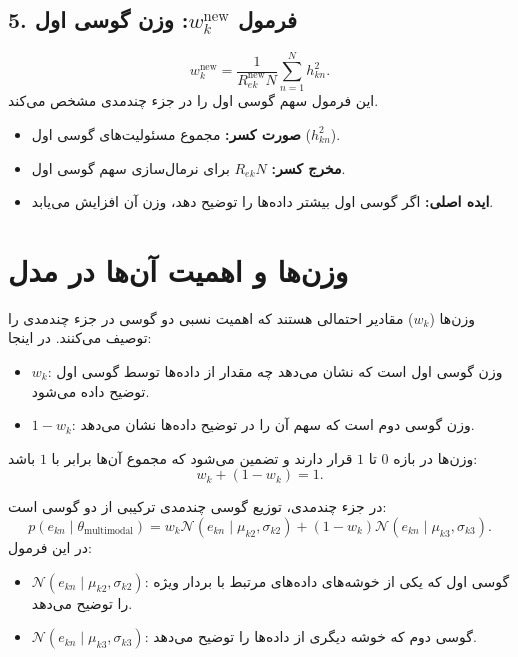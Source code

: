 \documentclass[a4paper,12pt,openany]{report}
\begin{document}
\begin{itemize}
	
	
	\subsection*{5. فرمول \( w_k^{\text{new}} \): وزن گوسی اول}
	\[
	w_k^{\text{new}} = \frac{1}{R_{ek}^{\text{new}} N} \sum_{n=1}^N h_{kn}^2.
	\]
	این فرمول سهم گوسی اول را در جزء چندمدی مشخص می‌کند.
	
	\begin{itemize}
		\item \textbf{صورت کسر:} 
		مجموع مسئولیت‌های گوسی اول (\( h_{kn}^2 \)).
		\item \textbf{مخرج کسر:} 
		\( R_{ek} N \) برای نرمال‌سازی سهم گوسی اول.
		\item \textbf{ایده اصلی:} 
		اگر گوسی اول بیشتر داده‌ها را توضیح دهد، وزن آن افزایش می‌یابد.
	\end{itemize}
	
	
	
	\section{وزن‌ها و اهمیت آن‌ها در مدل}
	
	وزن‌ها (\(w_k\)) مقادیر احتمالی هستند که اهمیت نسبی دو گوسی در جزء چندمدی را توصیف می‌کنند.  
	در اینجا:
	\begin{itemize}
		\item \(w_k\): وزن گوسی اول است که نشان می‌دهد چه مقدار از داده‌ها توسط گوسی اول توضیح داده می‌شود.
		\item \(1 - w_k\): وزن گوسی دوم است که سهم آن را در توضیح داده‌ها نشان می‌دهد.
	\end{itemize}
	
	وزن‌ها در بازه \(0\) تا \(1\) قرار دارند و تضمین می‌شود که مجموع آن‌ها برابر با \(1\) باشد:
	\[
	w_k + (1 - w_k) = 1.
	\]
	
	
	
	در جزء چندمدی، توزیع گوسی چندمدی ترکیبی از دو گوسی است:
	\[
	p(e_{kn} \mid \theta_{\text{multimodal}}) = w_k \mathcal{N}(e_{kn} \mid \mu_{k2}, \sigma_{k2}) + (1 - w_k) \mathcal{N}(e_{kn} \mid \mu_{k3}, \sigma_{k3}).
	\]
	در این فرمول:
	\begin{itemize}
		\item \(\mathcal{N}(e_{kn} \mid \mu_{k2}, \sigma_{k2})\): گوسی اول که یکی از خوشه‌های داده‌های مرتبط با بردار ویژه را توضیح می‌دهد.
		\item \(\mathcal{N}(e_{kn} \mid \mu_{k3}, \sigma_{k3})\): گوسی دوم که خوشه دیگری از داده‌ها را توضیح می‌دهد.
	\end{itemize}
	

\end{itemize}
\end{document}
